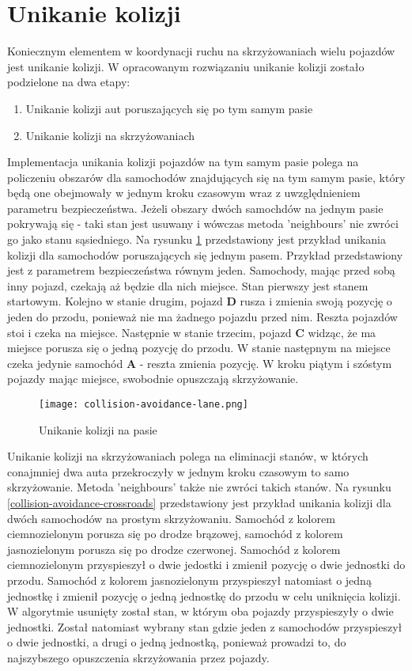 \section{Unikanie kolizji}

Koniecznym elementem w koordynacji ruchu na skrzyżowaniach wielu pojazdów jest unikanie kolizji. W opracowanym rozwiązaniu unikanie kolizji zostało podzielone na dwa etapy:
\begin{enumerate}
\item Unikanie kolizji aut poruszających się po tym samym pasie
\item Unikanie kolizji na skrzyżowaniach
\end{enumerate}
Implementacja unikania kolizji pojazdów na tym samym pasie polega na policzeniu obszarów dla samochodów znajdujących się na tym samym pasie, który będą one obejmowały w jednym kroku czasowym wraz z uwzględnieniem parametru bezpieczeństwa. Jeżeli obszary dwóch samochdów na jednym pasie pokrywają się - taki stan jest usuwany i wówczas metoda 'neighbours' nie zwróci go jako stanu sąsiedniego. Na rysunku \ref{collision-avoidance-lane} przedstawiony jest przykład unikania kolizji dla samochodów poruszających się jednym pasem. Przykład przedstawiony jest z parametrem bezpieczeństwa równym jeden. Samochody, mając przed sobą inny pojazd, czekają aż będzie dla nich miejsce. Stan pierwszy jest stanem startowym. Kolejno w stanie drugim, pojazd \textbf{D} rusza i zmienia swoją pozycję o jeden do przodu, ponieważ nie ma żadnego pojazdu przed nim. Reszta pojazdów stoi i czeka na miejsce. Następnie w stanie trzecim, pojazd \textbf{C} widząc, że ma miejsce porusza się o jedną pozycję do przodu. W stanie następnym na miejsce czeka jedynie samochód \textbf{A} - reszta zmienia pozycję. W kroku piątym i szóstym pojazdy mając miejsce, swobodnie opuszczają skrzyżowanie.
\begin{figure}[H]
    \texttt{[image: collision-avoidance-lane.png]}
  \caption{Unikanie kolizji na pasie}
  \label{collision-avoidance-lane}
\end{figure}
\newpage
Unikanie kolizji na skrzyżowaniach polega na eliminacji stanów, w których conajmniej dwa auta przekroczyły w jednym kroku czasowym to samo skrzyżowanie. Metoda 'neighbours' także nie zwróci takich stanów. Na rysunku \ref{collision-avoidance-crossroads} przedstawiony jest przykład unikania kolizji dla dwóch samochodów na prostym skrzyżowaniu. Samochód z kolorem ciemnozielonym porusza się po drodze brązowej, samochód z kolorem jasnozielonym porusza się po drodze czerwonej. Samochód z kolorem ciemnozielonym przyspieszył o dwie jedostki i zmienił pozycję o dwie jednostki do przodu. Samochód z kolorem jasnozielonym przyspieszył natomiast o jedną jednostkę i zmienił pozycję o jedną jednostkę do przodu w celu uniknięcia kolizji. W algorytmie usunięty został stan, w którym oba pojazdy przyspieszyły o dwie jednostki. Został natomiast wybrany stan gdzie jeden z samochodów przyspieszył o dwie jednostki, a drugi o jedną jednostką, ponieważ prowadzi to, do najszybszego opuszczenia skrzyżowania przez pojazdy.
